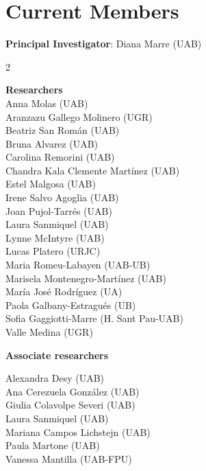 \documentclass[english,a4paper,12pt,titlepage]{report}
\begin{document}
	\chapter{Current Members}
	\begin{center}
	\textbf{Principal Investigator}: Diana Marre (UAB)\\
	
	\begin{multicols}{2}

\textbf{Researchers} \\
\vspace{0.2cm}
 Anna Molas (UAB) \\
 Aranzazu Gallego Molinero (UGR) \\
 Beatriz San Román (UAB) \\
 Bruna Alvarez (UAB) \\
 Carolina Remorini (UAB)\\
 Chandra Kala Clemente Martínez (UAB) \\
 Estel Malgosa (UAB) \\
 Irene Salvo Agoglia (UAB)\\
 Joan Pujol-Tarrés (UAB) \\
 Laura Sanmiquel (UAB) \\
 Lynne McIntyre (UAB) \\
 Lucas Platero (URJC) \\
 Maria Romeu-Labayen (UAB-UB) \\
 Marisela Montenegro-Martínez (UAB) \\
 María José Rodríguez (UA) \\
 Paola Galbany-Estragués (UB) \\
 Sofia Gaggiotti-Marre (H. Sant Pau-UAB) \\
 Valle Medina (UGR) \\

\vfill\null
\columnbreak

\textbf{Associate researchers} \\
\vspace{0.2cm}

Alexandra Desy (UAB) \\
Ana Cerezuela González (UAB)\\
Giulia Colavolpe Severi (UAB)\\
Laura Sanmiquel (UAB) \\
Mariana Campos Lichstejn (UAB)\\
Paula Martone (UAB)\\
Vanessa Mantilla (UAB-FPU)\\


\end{multicols}
\end{center}
\end{document}
